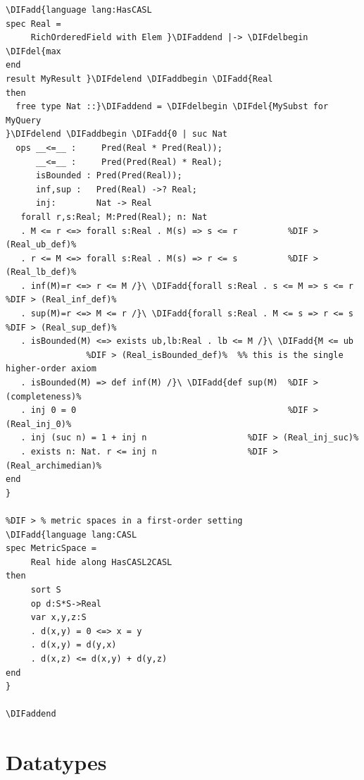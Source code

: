 \documentclass[10pt,fleqn,final]{scrreprt}
\newcommand{\sclause}[1]{\section{#1}}
\providecommand{\DIFadd}[1]{{\protect\color{blue}\uwave{#1}}} %
\providecommand{\DIFdel}[1]{{\protect\color{red}\sout{#1}}}                      %
\providecommand{\DIFaddbegin}{} %
\providecommand{\DIFaddend}{} %
\providecommand{\DIFdelbegin}{} %
\providecommand{\DIFdelend}{} %
\begin{document}
\begin{lstlisting}[basicstyle=\ttfamily,language=dolText,alsolanguage=CASL,escapechar=@,mathescape]
%DIF > % real numbers, using a specification of fields
\DIFadd{language lang:HasCASL
spec Real =
     RichOrderedField with Elem }\DIFaddend |-> \DIFdelbegin \DIFdel{max
end
result MyResult }\DIFdelend \DIFaddbegin \DIFadd{Real
then
  free type Nat ::}\DIFaddend = \DIFdelbegin \DIFdel{MySubst for MyQuery
}\DIFdelend \DIFaddbegin \DIFadd{0 | suc Nat
  ops __<=__ :     Pred(Real * Pred(Real));
      __<=__ :     Pred(Pred(Real) * Real);
      isBounded : Pred(Pred(Real));
      inf,sup :   Pred(Real) ->? Real;
      inj:        Nat -> Real
   forall r,s:Real; M:Pred(Real); n: Nat
   . M <= r <=> forall s:Real . M(s) => s <= r          %DIF > (Real_ub_def)%
   . r <= M <=> forall s:Real . M(s) => r <= s          %DIF > (Real_lb_def)%
   . inf(M)=r <=> r <= M /}\ \DIFadd{forall s:Real . s <= M => s <= r  %DIF > (Real_inf_def)%
   . sup(M)=r <=> M <= r /}\ \DIFadd{forall s:Real . M <= s => r <= s  %DIF > (Real_sup_def)%
   . isBounded(M) <=> exists ub,lb:Real . lb <= M /}\ \DIFadd{M <= ub
                %DIF > (Real_isBounded_def)%  %% this is the single higher-order axiom
   . isBounded(M) => def inf(M) /}\ \DIFadd{def sup(M)  %DIF > (completeness)%
   . inj 0 = 0                                          %DIF > (Real_inj_0)%
   . inj (suc n) = 1 + inj n                    %DIF > (Real_inj_suc)%
   . exists n: Nat. r <= inj n                  %DIF > (Real_archimedian)%
end
}

%DIF > % metric spaces in a first-order setting
\DIFadd{language lang:CASL
spec MetricSpace =
     Real hide along HasCASL2CASL
then
     sort S
     op d:S*S->Real
     var x,y,z:S
     . d(x,y) = 0 <=> x = y
     . d(x,y) = d(y,x)
     . d(x,z) <= d(x,y) + d(y,z)
end
}

\DIFaddend \end{lstlisting}




\sclause{Datatypes}\DIFaddbegin \label{ex:datatypes}
\DIFaddend 
\end{document}

